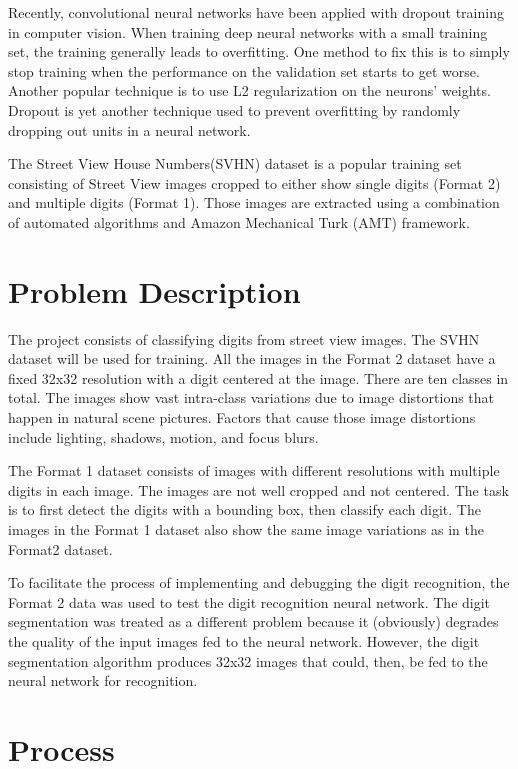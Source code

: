 \documentclass{article} %
\begin{document}
Recently, convolutional neural networks have been applied with dropout training in computer vision. When training deep neural networks with a small training set, the training generally leads to overfitting. One method to fix this is to simply stop training when the performance on the validation set starts to get worse. Another popular technique is to use L2 regularization on the neurons’ weights. Dropout is yet another technique used to prevent overfitting by randomly dropping out units in a neural network.

The Street View House Numbers(SVHN)\cite{svhn} dataset is a popular training set consisting of Street View images cropped to either show single digits (Format 2) and multiple digits (Format 1). Those images are extracted using a combination of automated algorithms and Amazon Mechanical Turk (AMT) framework.


\section{Problem Description}
The project consists of classifying digits from street view images. The SVHN dataset will be used for training. All the images in the Format 2 dataset have a fixed 32x32 resolution with a digit centered at the image. There are ten classes in total. The images show vast intra-class  variations due to image distortions that happen in natural scene pictures. Factors that cause those image distortions include lighting, shadows, motion, and focus blurs.

The Format 1 dataset consists of images with different resolutions with multiple digits in each image. The images are not well cropped and not centered. The task is to first detect the digits with a bounding box, then classify each digit. The images in the Format 1 dataset also show the same image variations as in the Format2 dataset.

To facilitate the process of implementing and debugging the digit recognition, the Format 2 data was used to test the digit recognition neural network. The digit segmentation was treated as a different problem because it (obviously) degrades the quality of the input images fed to the neural network. However, the digit segmentation algorithm produces 32x32 images that could, then, be fed to the neural network for recognition.

\section{Process}
\end{document}
